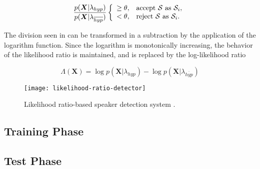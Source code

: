 \begin{equation}
    \frac{p(\boldsymbol{X}|\lambda_{hyp})}{p(\boldsymbol{X}|\lambda_{\overline{hyp}})} \verifytest{\theta}{\mathcal{S} \text{ as } \mathcal{S}_i}
    \label{eq:likelihood-ratio-test-3}
\end{equation}

The division seen in  can be transformed in a subtraction by the application of the logarithm function. Since the logarithm is monotonically increasing, the behavior of the likelihood ratio is maintained, and  is replaced by the log-likelihood ratio

\begin{equation}
    \Lambda(\boldsymbol{X}) = \log p(\boldsymbol{X}|\lambda_{hyp}) - \log p(\boldsymbol{X}|\lambda_{\overline{hyp}})
    \label{eq:log-likelihood-ratio}
\end{equation}

\begin{figure}[ht]
    \centering
    \texttt{[image: likelihood-ratio-detector]}
    \caption{Likelihood ratio-based speaker detection system \cite{bimbot.et.al.2004}.}
    \label{fig:likelihood-ratio-detector}
\end{figure}

\subsection{Training Phase}

\subsection{Test Phase}